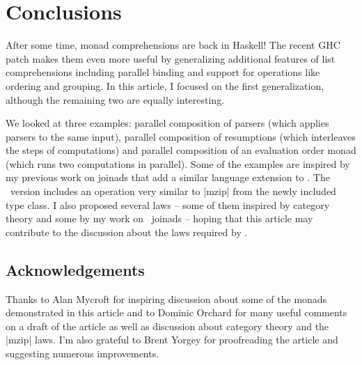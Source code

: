 \documentclass{tmr}
\begin{document}

\section{Conclusions}
After some time, monad comprehensions are back in Haskell! The recent GHC patch makes them even 
more useful by generalizing additional features of list comprehensions including parallel binding 
and support for operations like ordering and grouping. In this article, I focused on the first 
generalization, although the remaining two are equally interesting.

We looked at three examples: parallel composition of parsers (which applies 
parsers to the same input), parallel composition of resumptions (which interleaves
the steps of computations) and parallel composition of an evaluation order monad (which runs two 
computations in parallel). Some of the examples are inspired by my previous work on joinads that add 
a similar language extension to \fsharp. The \fsharp\ version includes an operation very similar to 
|mzip| from the newly included  type class. I also proposed several laws -- some of 
them inspired by category theory and some by my work on \fsharp\ joinads -- hoping 
that this article may contribute to the discussion about the laws required by .

\subsection{Acknowledgements}
Thanks to Alan Mycroft for inspiring discussion about some of the monads demonstrated in this article
and to Dominic Orchard for many useful comments on a draft of the article as well as discussion
about category theory and the |mzip| laws. I'm also grateful to Brent Yorgey for proofreading the article
and suggesting numerous improvements.




\end{document}
